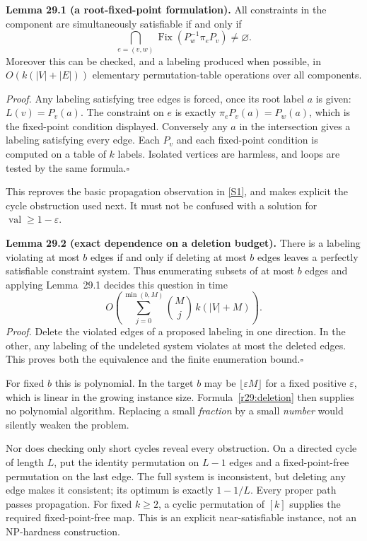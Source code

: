 \documentclass[11pt,a4paper]{article}
\newcommand{\sref}[2]{\hyperlink{source:#1:#2}{[S#2]}}
\numberwithin{equation}{section}
\begin{document}
\textbf{Lemma 29.1 (a root-fixed-point formulation).}
All constraints in the component are simultaneously satisfiable if and
only if
\begin{equation}\label{r29:holonomy}
 \bigcap_{e=(v,w)}\operatorname{Fix}(P_w^{-1}\pi_eP_v)
                       \ne\varnothing.
\end{equation}
Moreover this can be checked, and a labeling produced when possible, in
$O(k(|V|+|E|))$ elementary permutation-table operations over all components.

\emph{Proof.} Any labeling satisfying tree edges is forced, once its root
label $a$ is given: $L(v)=P_v(a)$. The constraint on $e$ is exactly
$\pi_eP_v(a)=P_w(a)$, which is the fixed-point condition displayed.
Conversely any $a$ in the intersection gives a labeling satisfying every
edge. Each $P_v$ and each fixed-point condition is computed on a table
of $k$ labels. Isolated vertices are harmless, and loops are tested by
the same formula.\hfill$\square$

This reproves the basic propagation observation in \sref{29}{1}, and
makes explicit the cycle obstruction used next. It must not be confused
with a solution for $\operatorname{val}\ge1-\varepsilon$.

\textbf{Lemma 29.2 (exact dependence on a deletion budget).}
There is a labeling violating at most $b$ edges if and only if deleting
at most $b$ edges leaves a perfectly satisfiable constraint system.
Thus enumerating subsets of at most $b$ edges and applying
Lemma~29.1 decides this question in time
\begin{equation}\label{r29:deletion}
       O\!\left(\sum_{j=0}^{\min(b,M)}\binom Mj\,k(|V|+M)\right).
\end{equation}
\emph{Proof.} Delete the violated edges of a proposed labeling in one
direction. In the other, any labeling of the undeleted system violates
at most the deleted edges. This proves both the equivalence and the
finite enumeration bound.\hfill$\square$

For fixed $b$ this is polynomial. In the target $b$ may be
$\lfloor\varepsilon M\rfloor$ for a fixed positive $\varepsilon$, which
is linear in the growing instance size. Formula~\eqref{r29:deletion}
then supplies no polynomial algorithm. Replacing a small \emph{fraction}
by a small \emph{number} would silently weaken the problem.

Nor does checking only short cycles reveal every obstruction. On a
directed cycle of length $L$, put the identity permutation on $L-1$
edges and a fixed-point-free permutation on the last edge. The full
system is inconsistent, but deleting any edge makes it consistent;
its optimum is exactly $1-1/L$. Every proper path passes propagation.
For fixed $k\ge2$, a cyclic permutation of $[k]$ supplies the required
fixed-point-free map. This is an explicit near-satisfiable instance, not
an NP-hardness construction.
\end{document}

